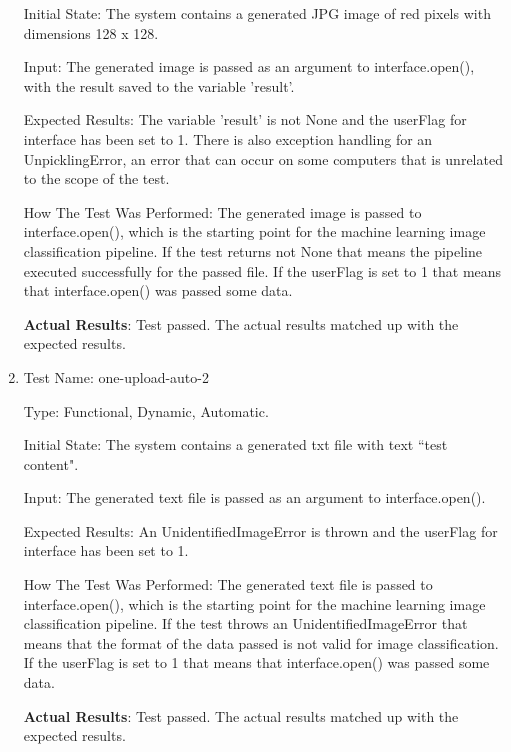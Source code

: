 \documentclass[12pt, titlepage]{article}
\begin{document}
\begin{enumerate}
		Initial State: The system contains a generated JPG image of red pixels with dimensions 128 x 128.
		
		Input: The generated image is passed as an argument to interface.open(), with the result saved to the variable 'result'.
		
		Expected Results: The variable 'result' is not None and the userFlag for interface has been set to 1. There is also exception handling for an UnpicklingError, an error that can occur on some computers that is unrelated to the scope of the test.
		
		How The Test Was Performed: The generated image is passed to interface.open(), which is the starting point for the machine learning image classification pipeline. If the test returns not None that means the pipeline executed successfully for the passed file. If the userFlag is set to 1 that means that interface.open() was passed some data.
		
		\textbf{Actual Results}: Test passed. The actual results matched up with the expected results.
		
        \item{Test Name: one-upload-auto-2}
        
        Type: Functional, Dynamic, Automatic.
		
		Initial State: The system contains a generated txt file with text ``test content".
		
		Input: The generated text file is passed as an argument to interface.open().
		
		Expected Results: An UnidentifiedImageError is thrown and the userFlag for interface has been set to 1.
		
		How The Test Was Performed: The generated text file is passed to interface.open(), which is the starting point for the machine learning image classification pipeline. If the test throws an UnidentifiedImageError that means that the format of the data passed is not valid for image classification. If the userFlag is set to 1 that means that interface.open() was passed some data.
		
		\textbf{Actual Results}: Test passed. The actual results matched up with the expected results. 
		
	\end{enumerate}
		
\end{document}
